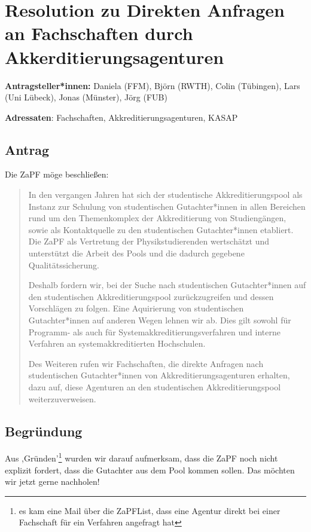 \documentclass[draft,10pt,oneside]{scrartcl}
\begin{document}
\section*{Resolution zu Direkten Anfragen an Fachschaften durch
Akkerditierungsagenturen}

\textbf{Antragsteller*innen:} Daniela (FFM), Björn (RWTH), Colin (Tübingen),
Lars (Uni Lübeck), Jonas (Münster), Jörg (FUB)

\textbf{Adressaten}: Fachschaften, Akkreditierungsagenturen, KASAP

\subsection*{Antrag}

Die ZaPF möge beschließen:

\begin{quote}
    In den vergangen Jahren hat sich der studentische Akkreditierungspool als
    Instanz zur Schulung von studentischen Gutachter*innen in allen Bereichen
    rund um den Themenkomplex der Akkreditierung von Studiengängen, sowie als
    Kontaktquelle zu den studentischen Gutachter*innen etabliert. Die ZaPF als
    Vertretung der Physikstudierenden wertschätzt und unterstützt die Arbeit
    des Pools und die dadurch gegebene Qualitätssicherung.

    Deshalb fordern wir, bei der Suche nach studentischen Gutachter*innen auf
    den studentischen Akkreditierungspool zurückzugreifen und dessen
    Vorschlägen zu folgen. Eine Aquirierung von studentischen Gutachter*innen
    auf anderen Wegen lehnen wir ab. Dies gilt sowohl für Programm- als auch
    für Systemakkreditierungsverfahren und interne Verfahren an
    systemakkreditierten Hochschulen.

    Des Weiteren rufen wir Fachschaften, die direkte Anfragen nach
    studentischen Gutachter*innen von Akkreditierungsagenturen erhalten, dazu
    auf, diese Agenturen an den studentischen Akkreditierungspool
    weiterzuverweisen.
\end{quote}

\subsection*{Begründung}
Aus ,Gründen'\footnote{es kam eine Mail über die ZaPFList, dass eine Agentur
direkt bei einer Fachschaft für ein Verfahren angefragt hat } wurden wir darauf
aufmerksam, dass die ZaPF noch nicht explizit fordert, dass die Gutachter aus
dem Pool kommen sollen. Das möchten wir jetzt gerne nachholen!
\end{document}
